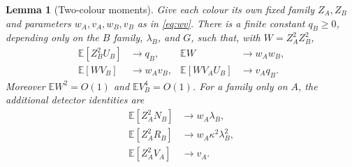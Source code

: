 \documentclass[11pt]{article}
\newtheorem{lemma}[theorem]{Lemma}
\theoremstyle{remark}
\numberwithin{equation}{section}
\newcommand{\E}{\mathbb E}
\begin{document}
\begin{lemma}[Two-colour moments]\label{lem:tensor}
Give each colour its own fixed family $Z_A,Z_B$ and parameters
$w_A,v_A,w_B,v_B$ as in \eqref{eq:wv}. There is a finite constant
$q_B\ge0$, depending only on the $B$ family, $\lambda_B$, and $G$,
such that, with $W=Z_A^2Z_B^2$,
\begin{align}
 \E[Z_B^2U_B]&\longrightarrow q_B,&
 \E W&\longrightarrow w_Aw_B,\label{eq:tensor1}\\
 \E[WV_B]&\longrightarrow w_Av_B,&
 \E[WV_AU_B]&\longrightarrow v_Aq_B.\label{eq:tensor2}
\end{align}
Moreover $\E W^2=O(1)$ and $\E V_B^4=O(1)$.
For a family only on $A$, the additional detector identities are
\begin{align}
 \E[Z_A^2N_B]&\longrightarrow w_A\lambda_B,\label{eq:singlefirst}\\
 \E[Z_A^2R_B]&\longrightarrow w_A\kappa^2\lambda_B^2,\label{eq:singlepair}\\
 \E[Z_A^2V_A]&\longrightarrow v_A.\label{eq:singlemark}
\end{align}
\end{lemma}
\end{document}
